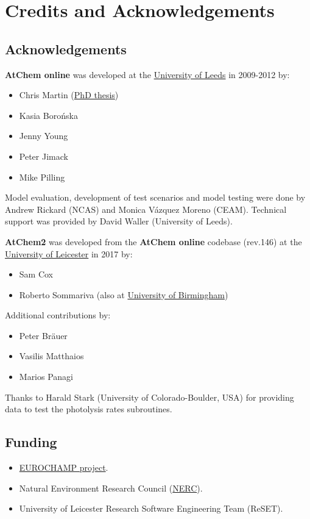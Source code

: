 \chapter{Credits and Acknowledgements} \label{ch:credits}

\section{Acknowledgements} \label{sec:acknowledgements}

\textbf{AtChem online} was developed at the
\href{https://www.leeds.ac.uk}{University of Leeds} in 2009-2012 by:

\begin{itemize}
\item Chris Martin (\href{http://etheses.whiterose.ac.uk/1596/}{PhD thesis})
\item Kasia Boro{\'n}ska
\item Jenny Young
\item Peter Jimack
\item Mike Pilling
\end{itemize}

Model evaluation, development of test scenarios and model testing were
done by Andrew Rickard (NCAS) and Monica V{\'a}zquez Moreno (CEAM).
Technical support was provided by David Waller (University of Leeds).

\textbf{AtChem2} was developed from the \textbf{AtChem online}
codebase (rev.146) at the \href{https://le.ac.uk}{University of Leicester}
in 2017 by:

\begin{itemize}
\item Sam Cox
\item Roberto Sommariva (also at \href{https://www.birmingham.ac.uk}{University of Birmingham})
\end{itemize}

Additional contributions by:

\begin{itemize}
\item Peter Br{\"a}uer
\item Vasilis Matthaios
\item Marios Panagi
\end{itemize}

Thanks to Harald Stark (University of Colorado-Boulder, USA) for
providing data to test the photolysis rates subroutines.

\section{Funding} \label{sec:funding}

\begin{itemize}
\item \href{https://www.eurochamp.org/}{EUROCHAMP project}.
\item Natural Environment Research Council
(\href{https://nerc.ukri.org/}{NERC}).
\item University of Leicester Research Software Engineering Team (ReSET).
\end{itemize}
